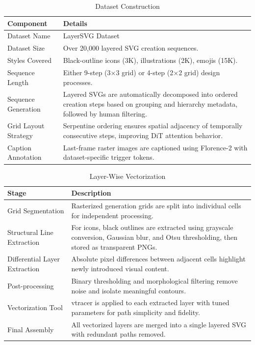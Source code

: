 \begin{table}[h!]
\centering
\caption{Dataset Construction}
\begin{tabular}{|l|p{10cm}|}
\hline
\textbf{Component} & \textbf{Details} \\ \hline
Dataset Name &
LayerSVG Dataset \\ \hline
Dataset Size &
Over 20,000 layered SVG creation sequences. \\ \hline
Styles Covered &
Black-outline icons (3K), illustrations (2K), emojis (15K). \\ \hline
Sequence Length &
Either 9-step (3×3 grid) or 4-step (2×2 grid) design processes. \\ \hline
Sequence Generation &
Layered SVGs are automatically decomposed into ordered creation steps based on grouping and hierarchy metadata, followed by human filtering. \\ \hline
Grid Layout Strategy &
Serpentine ordering ensures spatial adjacency of temporally consecutive steps, improving DiT attention behavior. \\ \hline
Caption Annotation &
Last-frame raster images are captioned using Florence-2 with dataset-specific trigger tokens. \\ \hline
\end{tabular}
\end{table}

\begin{table}[h!]
\centering
\caption{Layer-Wise Vectorization}
\begin{tabular}{|l|p{10cm}|}
\hline
\textbf{Stage} & \textbf{Description} \\ \hline
Grid Segmentation &
Rasterized generation grids are split into individual cells for independent processing. \\ \hline
Structural Line Extraction &
For icons, black outlines are extracted using grayscale conversion, Gaussian blur, and Otsu thresholding, then stored as transparent PNGs. \\ \hline
Differential Layer Extraction &
Absolute pixel differences between adjacent cells highlight newly introduced visual content. \\ \hline
Post-processing &
Binary thresholding and morphological filtering remove noise and isolate meaningful contours. \\ \hline
Vectorization Tool &
vtracer is applied to each extracted layer with tuned parameters for path simplicity and fidelity. \\ \hline
Final Assembly &
All vectorized layers are merged into a single layered SVG with redundant paths removed. \\ \hline
\end{tabular}
\end{table}

